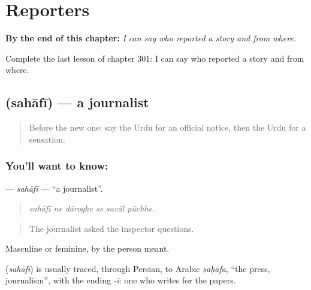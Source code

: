 
\chapter{Reporters}
\label{ch:ur-reporters}

\begin{chapteropening}
\textbf{By the end of this chapter:} \emph{I can say who reported a story and from where.}

Complete the last lesson of chapter 301: I can say who reported a story and from where.
\end{chapteropening}

\section[\texorpdfstring{\ur{صحافی} (sahāfī)}{صحافی (sahāfī)}]{ (sahāfī) — a journalist}

\label{lesson:UR-C301-sahafi}



\begin{quote}
Before the new one: say the Urdu for an official notice, then the Urdu for a sensation.
\end{quote}

\subsection*{You'll want to know: }
\textbf{} — \emph{sahāfī} — \textquotedblleft{}a journalist\textquotedblright{}.

\begin{quote}
     
\end{quote}

\begin{quote}
\emph{sahāfī ne dāroghe se savāl pūchhe.}
\end{quote}

\begin{quote}
The journalist asked the inspector questions.
\end{quote}

Masculine or feminine, by the person meant.

\begin{cousinweb}
\textbf{} (\emph{sahāfī}) is usually traced, through Persian, to Arabic \emph{ṣaḥāfa}, \textquotedblleft{}the press, journalism\textquotedblright{}, with the ending \emph{-ī}: one who writes for the papers.
\end{cousinweb}

